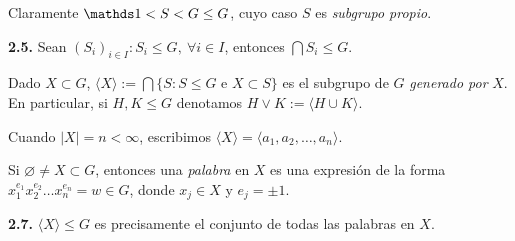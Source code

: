 \begin{note}
    Claramente \(\id< S <G \leq G\), cuyo caso \(S\) es \emph{subgrupo propio}. 
\end{note}


\hypertarget{thm25}{}
\begin{theorem}
    \textbf{2.5.} Sean \((S_i)_{i\in I} : S_i \leq G, \ \forall i \in I\), entonces \(\bigcap S_i \leq G\). 
\end{theorem}


\begin{definition}
    Dado \(X \subset G\), \(\langle X \rangle:= \bigcap \{S : S \leq G \text{ e } X \subset S\} \) es el subgrupo de \(G\) \emph{generado por} \(X\). En particular, si \(H, K \leq G\) denotamos \(H \lor K := \langle H \cup K \rangle  \). 
\end{definition}

\begin{note}
    Cuando \(|X|= n < \infty\), escribimos \(\langle X \rangle = \langle a_1, a_2, \ldots, a_n\rangle\).  
\end{note}

\begin{definition}
    Si \(\varnothing \neq X\subset G\), entonces una \emph{palabra} en \(X\) es una expresión de la forma \(x_1^{e_1} x_2^{e_2}\ldots x_n^{e_n}= w \in G\), donde \(x_j \in X\) y \(e_j = \pm 1 \).    
\end{definition}

\begin{theorem}
    \textbf{2.7.} \(\langle X \rangle \leq G\) es precisamente el conjunto de todas las palabras en \(X\). 
\end{theorem}

